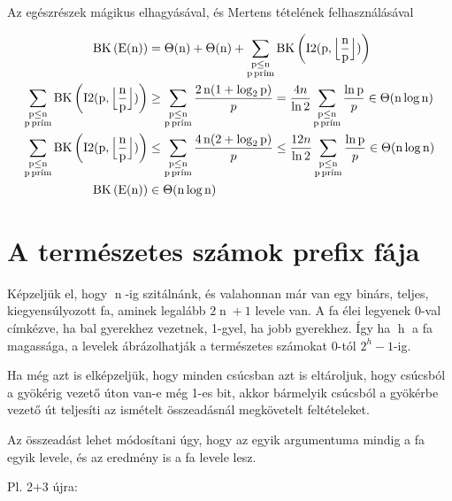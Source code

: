 \documentclass[a4paper]{article}
\newcommand*{\fBC}[1]{\ensuremath{\operatorname{BK\left(#1\right)}}}
\newcommand*{\vH}{\ensuremath{\operatorname{h}}}
\newcommand*{\vN}{\ensuremath{\operatorname{n}}}
\newcommand*{\vP}{\ensuremath{\operatorname{p}}}
\begin{document}
Az egészrészek mágikus elhagyásával, és Mertens tételének felhasználásával

\begin{align*}
\fBC{E(\vN)} &= \Theta(\vN) + \Theta(\vN)
	+ \sum_{\substack{\vP \leq \vN\\\vP \text{prím}}}
		\fBC{I2(p, \Bigl\lfloor \frac{\vN}{\vP} \Bigr\rfloor)}
\\
\sum_{\substack{\vP \leq \vN\\\vP \text{prím}}}
	\fBC{I2(p, \Bigl\lfloor \frac{\vN}{\vP} \Bigr\rfloor)}
& \geq \sum_{\substack{\vP \leq \vN\\\vP \text{prím}}}
	\frac{2 \vN ( 1 + \log_{2}{\vP} )}{p}
= \frac{4n}{\ln{2}} \sum_{\substack{\vP \leq \vN\\\vP \text{prím}}}
	\frac{\ln{\vP}}{p}
\in \Theta(\vN \log{\vN})
\\
\sum_{\substack{\vP \leq \vN\\\vP \text{prím}}}
	\fBC{I2(p, \Bigl\lfloor \frac{\vN}{\vP} \Bigr\rfloor)}
& \leq \sum_{\substack{\vP \leq \vN\\\vP \text{prím}}}
	\frac{4 \vN (2+\log_{2}{\vP})}{p}
\leq \frac{12n}{\ln{2}} \sum_{\substack{\vP \leq \vN\\\vP \text{prím}}}
	\frac{\ln{\vP}}{p}
\in \Theta(\vN \log{\vN})
\\
\fBC{E(\vN)} & \in \Theta(\vN \log{\vN})
\end{align*}

\section{A természetes számok prefix fája}

Képzeljük el, hogy $\vN$-ig szitálnánk, és valahonnan már van egy binárs, teljes, kiegyensúlyozott
fa, aminek legalább $2\vN+1$ levele van. A fa élei legyenek 0-val címkézve, ha bal gyerekhez vezetnek, 1-gyel, ha jobb gyerekhez. Így ha $\vH$ a fa magassága, a levelek ábrázolhatják a
természetes számokat $0$-tól $2^h-1$-ig.

Ha még azt is elképzeljük, hogy minden csúcsban azt is eltároljuk, hogy csúcsból a gyökérig vezető úton van-e még 1-es bit, akkor bármelyik csúcsból a gyökérbe vezető út teljesíti az ismételt összeadásnál megkövetelt feltételeket.

Az összeadást lehet módosítani úgy, hogy az egyik argumentuma mindig a fa egyik levele,
és az eredmény is a fa levele lesz.

Pl. 2+3 újra:
\end{document}
